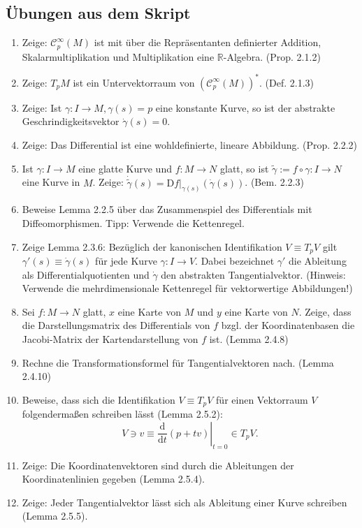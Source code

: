 \documentclass[a4paper]{scrartcl}
\newcommand{\D}{\mathrm{d}}
\newcommand{\DD}{\mathrm{D}}
\newcommand{\sC}{\mathcal{C}^{\infty}}
\begin{document}
	\subsection{Übungen aus dem Skript}
	\begin{enumerate}
		\item Zeige: $\sC_p(M)$ ist mit über die Repräsentanten definierter Addition, Skalarmultiplikation und Multiplikation eine $\mathbb R$-Algebra. (Prop. 2.1.2)
		\item Zeige: $T_pM$ ist ein Untervektorraum von $(\sC_p(M))^*$. (Def. 2.1.3)
		\item Zeige: Ist $\gamma\colon I\to M, \gamma(s) = p$ eine konstante Kurve, so ist der abstrakte Geschrindigkeitsvektor $\dot\gamma(s) = 0$.
		\item Zeige: Das Differential ist eine wohldefinierte, lineare Abbildung. (Prop. 2.2.2)
		\item Ist $\gamma\colon I \to M$ eine glatte Kurve und $f\colon M \to N$ glatt, so ist $\tilde\gamma := f\circ\gamma \colon I \to N$ eine Kurve in $M$. Zeige: $\dot{\tilde\gamma}(s) = \left.\DD f\right|_{\gamma(s)} (\dot\gamma(s))$. (Bem. 2.2.3)
		\item Beweise Lemma 2.2.5 über das Zusammenspiel des Differentials mit Diffeomorphismen. Tipp: Verwende die Kettenregel.
		\item Zeige Lemma 2.3.6: Bezüglich der kanonischen Identifikation $V\equiv T_pV$ gilt $\gamma'(s) \equiv \dot\gamma(s)$ für jede Kurve $\gamma\colon I\rightarrow V$. Dabei bezeichnet $\gamma'$ die Ableitung als Differentialquotienten und $\dot{\gamma}$ den abstrakten Tangentialvektor. (Hinweis: Verwende die mehrdimensionale Kettenregel für vektorwertige Abbildungen!)
		\item Sei $f\colon M \to N$ glatt, $x$ eine Karte von $M$ und $y$ eine Karte von $N$. Zeige, dass die Darstellungsmatrix des Differentials von $f$ bzgl. der Koordinatenbasen die Jacobi-Matrix der Kartendarstellung von $f$ ist. (Lemma 2.4.8)
		\item Rechne die Transformationsformel für Tangentialvektoren nach. (Lemma 2.4.10)
		\item Beweise, dass sich die Identifikation $V\equiv T_pV$ für einen Vektorraum $V$ folgendermaßen schreiben lässt (Lemma 2.5.2): 
		\[V \ni v \equiv \left.\frac{\D}{\D t}(p + tv)\right|_{t=0} \in T_pV.\]
		\item Zeige: Die Koordinatenvektoren sind durch die Ableitungen der Koordinatenlinien gegeben (Lemma 2.5.4).
		\item Zeige: Jeder Tangentialvektor lässt sich als Ableitung einer Kurve schreiben (Lemma 2.5.5).
	\end{enumerate}
\end{document}
